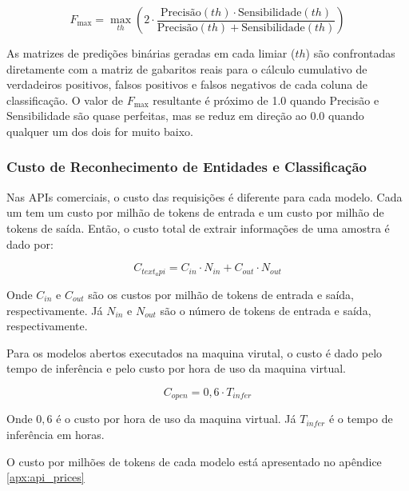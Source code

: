 \documentclass{IEEEphot}
\begin{document}
\begin{equation}
F_{\text{max}} = \max_{th} \left( 2 \cdot \frac{\text{Precisão}(th) \cdot \text{Sensibilidade}(th)}{\text{Precisão}(th) + \text{Sensibilidade}(th)} \right)
\end{equation}

As matrizes de predições binárias geradas em cada limiar ($th$) são confrontadas diretamente com a matriz de gabaritos reais para o cálculo cumulativo de verdadeiros positivos, falsos positivos e falsos negativos de cada coluna de classificação. O valor de $F_{\text{max}}$ resultante é próximo de 1.0 quando Precisão e Sensibilidade são quase perfeitas, mas se reduz em direção ao 0.0 quando qualquer um dos dois for muito baixo.

\subsubsection{Custo de Reconhecimento de Entidades e Classificação}

Nas APIs comerciais, o custo das requisições é diferente para cada modelo. Cada um tem um custo por milhão de tokens de entrada e um custo por milhão de tokens de saída. Então, o custo total de extrair informações de uma amostra é dado por:

\begin{equation}
C_{text_api} = C_{in} \cdot N_{in} + C_{out} \cdot N_{out}
\end{equation}

Onde $C_{in}$ e $C_{out}$ são os custos por milhão de tokens de entrada e saída, respectivamente. Já $N_{in}$ e $N_{out}$ são o número de tokens de entrada e saída, respectivamente.

Para os modelos abertos executados na maquina virutal, o custo é dado pelo tempo de inferência e pelo custo por hora de uso da maquina virtual. 

\begin{equation}
C_{open} = 0,6 \cdot T_{infer}
\end{equation}

Onde $0,6$ é o custo por hora de uso da maquina virtual. Já $T_{infer}$ é o tempo de inferência em horas.

O custo por milhões de tokens de cada modelo está apresentado no apêndice \ref{apx:api_prices}
\end{document}
